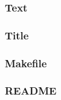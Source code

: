 \subsubsection{Text}

\subsubsection{Title}

\subsubsection{Makefile}

\subsubsection{README}\label{README}


%








%


